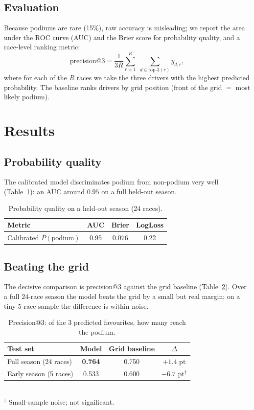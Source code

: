 \documentclass[10pt,twocolumn]{article}
\begin{document}
\subsection{Evaluation}
Because podiums are rare (15\%), raw accuracy is misleading; we report the area
under the ROC curve (AUC) and the Brier score for probability quality, and a
race-level ranking metric:
\begin{equation}
  \text{precision@3} =
  \frac{1}{3R}\sum_{r=1}^{R}\;\sum_{d \in \text{top-3}(r)} y_{d,r},
\end{equation}
where for each of the $R$ races we take the three drivers with the highest
predicted probability. The baseline ranks drivers by grid position
(front of the grid $=$ most likely podium).

\section{Results}

\subsection{Probability quality}
The calibrated model discriminates podium from non-podium very well
(Table~\ref{tab:f1q}): an AUC around $0.95$ on a full held-out season.

\begin{table}[t]
\centering
\caption{Probability quality on a held-out season (24 races).}
\label{tab:f1q}
\begin{tabular}{lccc}
\toprule
Metric & AUC & Brier & LogLoss \\
\midrule
Calibrated $P(\text{podium})$ & 0.95 & 0.076 & 0.22 \\
\bottomrule
\end{tabular}
\end{table}

\subsection{Beating the grid}
The decisive comparison is precision@3 against the grid baseline
(Table~\ref{tab:f1p}). Over a full 24-race season the model beats the grid by a
small but real margin; on a tiny 5-race sample the difference is within noise.

\begin{table}[t]
\centering
\caption{Precision@3: of the 3 predicted favourites, how many reach the podium.}
\label{tab:f1p}
\begin{tabular}{lccc}
\toprule
Test set & Model & Grid baseline & $\Delta$ \\
\midrule
Full season (24 races) & \textbf{0.764} & 0.750 & $+1.4$ pt \\
Early season (5 races) & 0.533 & 0.600 & $-6.7$ pt$^\dagger$ \\
\bottomrule
\end{tabular}\\[2pt]
{\footnotesize $^\dagger$ Small-sample noise; not significant.}
\end{table}
\end{document}
